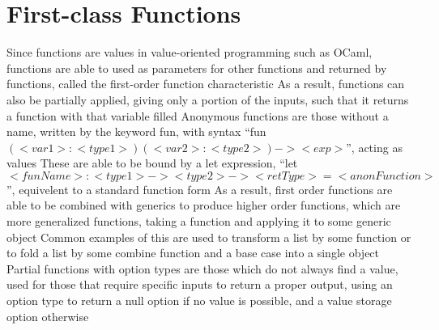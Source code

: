 \documentclass[11 pt, twoside]{article}
\newenvironment{outline*}
{
	\begin{outline}[enumerate]
	}
	{\end{outline}
}
\begin{document}
\section{First-class Functions}
\begin{outline*}
\1 Since functions are values in value-oriented programming such as OCaml, functions are able to used as parameters for other functions and returned by functions, called the first-order function characteristic
	\2 As a result, functions can also be partially applied, giving only a portion of the inputs, such that it returns a function with that variable filled
	\2 Anonymous functions are those without a name, written by the keyword fun, with syntax ``fun $(<var1>:<type1>) (<var2>:<type2>) -> <exp>$'', acting as values
		\3 These are able to be bound by a let expression, ``let $<funName> : <type1> -> <type2> -> <retType> = <anonFunction>$'', equivelent to a standard function form
\1 As a result, first order functions are able to be combined with generics to produce higher order functions, which are more generalized functions, taking a function and applying it to some generic object
	\2 Common examples of this are used to transform a list by some function or to fold a list by some combine function and a base case into a single object
\1 Partial functions with option types are those which do not always find a value, used for those that require specific inputs to return a proper output, using an option type to return a null option if no value is possible, and a value storage option otherwise
\end{outline*}
\end{document}
